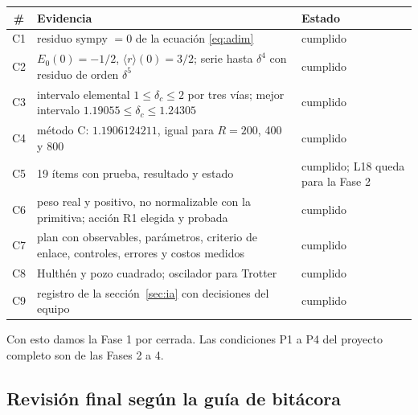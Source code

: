 \documentclass[11pt]{article}
\newcommand{\dc}{\delta_c}
\begin{document}
\begin{table}[H]
\centering
\small
\begin{tabular}{@{}cL{9.3cm}l@{}}
\toprule
\# & \textbf{Evidencia} & \textbf{Estado}\\
\midrule
C1 & residuo sympy $=0$ de la ecuación \eqref{eq:adim} & cumplido\\
C2 & $E_0(0)=-1/2$, $\langle r\rangle(0)=3/2$; serie hasta $\delta^4$ con residuo de orden $\delta^5$ & cumplido\\
C3 & intervalo elemental $1\le\dc\le2$ por tres vías; mejor intervalo $1.19055\le\dc\le1.24305$ & cumplido\\
C4 & método C: $1.1906124211$, igual para $R=200$, 400 y 800 & cumplido\\
C5 & 19 ítems con prueba, resultado y estado & cumplido; L18 queda para la Fase 2\\
C6 & peso real y positivo, no normalizable con la primitiva; acción R1 elegida y probada & cumplido\\
C7 & plan con observables, parámetros, criterio de enlace, controles, errores y costos medidos & cumplido\\
C8 & Hulthén y pozo cuadrado; oscilador para Trotter & cumplido\\
C9 & registro de la sección~\ref{sec:ia} con decisiones del equipo & cumplido\\
\bottomrule
\end{tabular}
\end{table}

Con esto damos la Fase 1 por cerrada. Las condiciones P1 a P4 del proyecto completo son de las Fases 2 a 4.

\subsection{Revisión final según la guía de bitácora}
\end{document}
